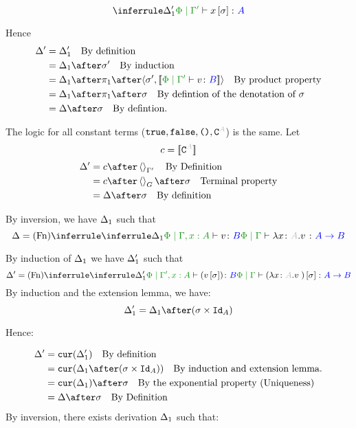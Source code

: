 {\begin{equation}
    \treeruleI{\D_1'}{\etyperelation{\P}{\G'}{x\ssi}{A}}
\end{equation}



Hence
\begin{align}
    \D' & = \D_1' \qt{By definition}\\
        & = \D_1\after\si'\qt{By induction}\\
        & = \D_1\after\p\after\pr{\si'}{\deno{\etyperelation{\P}{\G'}{v}{B}}}\qt{By product property}\\
        & = \D_1\after\p\after\si\qt{By defintion of the denotation of $\si$}\\
        & = \D\after\si\qt{By defintion.}
\end{align}

The logic for all constant terms ($\t,\f,\u,\const{A}$) is the same.
Let
\begin{equation}
    c = \deno{\const{A}}
\end{equation}
\begin{align}
    \D' & = c\after\term{\G'}\qt{By Definition}\\
        & = c\after\term{G}\after\si\qt{Terminal property}\\
        & = \D\after\si\qt{By definition}
\end{align}



By inversion, we have $\Delta_1$ such that
\begin{equation}
    \D = \ntreeruleI{Fn}{
        \treeruleI{\D_1}{\etyperelation{\P}{\G, x:A}{v}{B}}
    }{\etyperelation{\P}{\G}{\lam{x}{A}{v}}{\ab}}
\end{equation}

By induction of $\Delta_1$ we have $\Delta_1'$ such that
\begin{equation}
    \D' = \ntreeruleI{Fn}{
        \treeruleI{\D_1'}{\etyperelation{\P}{\G', x:A}{(v\ssi)}{B}}
    }{\etyperelation{\P}{\G}{(\lam{x}{A}{v})\ssi}{\ab}}
\end{equation}
By induction and the extension lemma, we have:
\begin{equation}
    \D_1' = \D_1\after(\si\times\Id{A})
\end{equation}

Hence:

\begin{align}
    \D' &= \cur{\D_1'}\qt{By definition}\\
        &= \cur{\D_1\after(\si\times\Id{A})}\qt{By induction and extension lemma.}\\
        & = \cur{\D_1}\after\si\qt{By the exponential property (Uniqueness)}\\
        &= \D\after\si\qt{By Definition}\\
\end{align}
By inversion, there exists derivation $\Delta_1$ such that:

}
